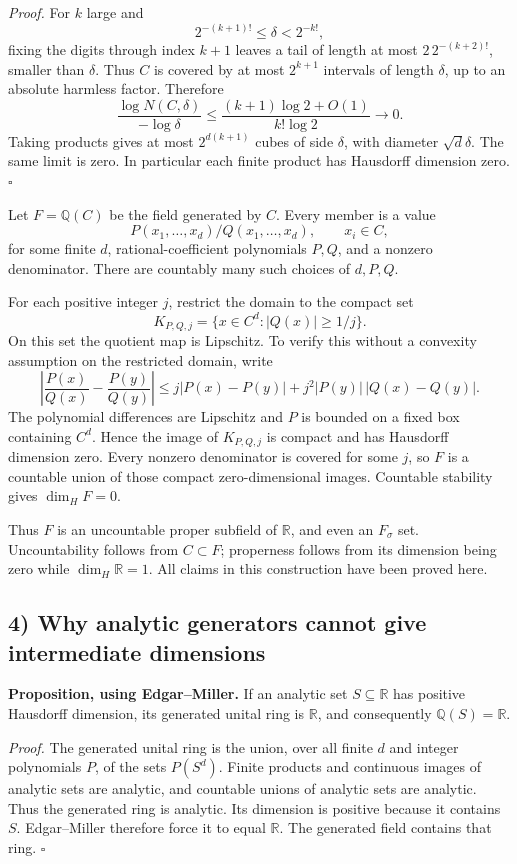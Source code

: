 \emph{Proof.} For $k$ large and
\[
 2^{-(k+1)!}\leq\delta<2^{-k!},
\]
fixing the digits through index $k+1$ leaves a tail of length at most $2\,2^{-(k+2)!}$, smaller than $\delta$. Thus $C$ is covered by at most $2^{k+1}$ intervals of length $\delta$, up to an absolute harmless factor. Therefore
\[
 \frac{\log N(C,\delta)}{-\log\delta}\leq\frac{(k+1)\log2+O(1)}{k!\log2}\longrightarrow0.
\]
Taking products gives at most $2^{d(k+1)}$ cubes of side $\delta$, with diameter $\sqrt d\delta$. The same limit is zero. In particular each finite product has Hausdorff dimension zero. $\square$

Let $F=\mathbb Q(C)$ be the field generated by $C$. Every member is a value
\[
 P(x_1,\ldots,x_d)/Q(x_1,\ldots,x_d),\qquad x_i\in C,
\]
for some finite $d$, rational-coefficient polynomials $P,Q$, and a nonzero denominator. There are countably many such choices of $d,P,Q$.

For each positive integer $j$, restrict the domain to the compact set
\[
 K_{P,Q,j}=\{x\in C^d:|Q(x)|\geq1/j\}.
\]
On this set the quotient map is Lipschitz. To verify this without a convexity assumption on the restricted domain, write
\[
 \left|\frac{P(x)}{Q(x)}-\frac{P(y)}{Q(y)}\right|
 \leq j|P(x)-P(y)|+j^2|P(y)|\,|Q(x)-Q(y)|.
\]
The polynomial differences are Lipschitz and $P$ is bounded on a fixed box containing $C^d$. Hence the image of $K_{P,Q,j}$ is compact and has Hausdorff dimension zero. Every nonzero denominator is covered for some $j$, so $F$ is a countable union of those compact zero-dimensional images. Countable stability gives $\dim_H F=0$.

Thus $F$ is an uncountable proper subfield of $\mathbb R$, and even an $F_\sigma$ set. Uncountability follows from $C\subset F$; properness follows from its dimension being zero while $\dim_H\mathbb R=1$. All claims in this construction have been proved here.

\subsection*{4) Why analytic generators cannot give intermediate dimensions}
\textbf{Proposition, using Edgar--Miller.} If an analytic set $S\subseteq\mathbb R$ has positive Hausdorff dimension, its generated unital ring is $\mathbb R$, and consequently $\mathbb Q(S)=\mathbb R$.

\emph{Proof.} The generated unital ring is the union, over all finite $d$ and integer polynomials $P$, of the sets $P(S^d)$. Finite products and continuous images of analytic sets are analytic, and countable unions of analytic sets are analytic. Thus the generated ring is analytic. Its dimension is positive because it contains $S$. Edgar--Miller therefore force it to equal $\mathbb R$. The generated field contains that ring. $\square$

